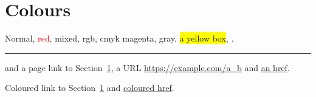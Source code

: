 \documentclass{article}
\begin{document}
\section{Colours}\label{sec}
Normal, \textcolor{red}{red}, \textcolor{blue!60!green}{mixed}, \textcolor[rgb]{0.2,0.5,0.8}{rgb},
\textcolor[cmyk]{0,1,0,0}{cmyk magenta}, \textcolor[gray]{0.5}{gray}.
\colorbox{yellow}{a yellow box}, .
{\color{orange}\rule{3cm}{4pt}} and a page link to Section~\ref{sec}, a URL \url{https://example.com/a_b}
and \href{https://flashtex.dev}{an href}.

\hypersetup{colorlinks=true, linkcolor=magenta, urlcolor=cyan}
Coloured link to Section~\ref{sec} and \href{https://flashtex.dev}{coloured href}.
\end{document}
